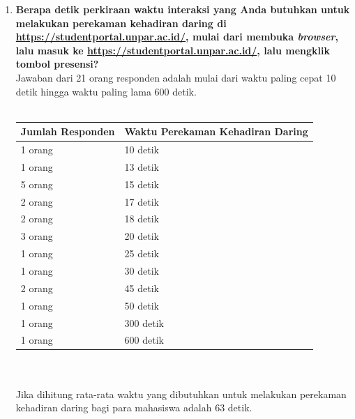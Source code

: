 \begin{enumerate}
	\item \textbf{Berapa detik perkiraan waktu interaksi yang Anda butuhkan untuk melakukan perekaman kehadiran daring di \url{https://studentportal.unpar.ac.id/}, mulai dari membuka \textit{browser}, lalu masuk ke \url{https://studentportal.unpar.ac.id/}, lalu mengklik tombol presensi?}\\
	Jawaban dari 21 orang responden adalah mulai dari waktu paling cepat 10 detik hingga waktu paling lama 600 detik.\\ \\
	 \begin{tabular}{|p{4cm} |p{7cm}|}
		\hline
		Jumlah Responden &  Waktu Perekaman Kehadiran Daring \\ \hline     
		1 orang &  10 detik\\ \hline 
		1 orang &  13 detik\\ \hline 
		5 orang &  15 detik\\ \hline 
		2 orang &  17 detik\\ \hline 
		2 orang &  18 detik\\ \hline 
		3 orang &  20 detik\\ \hline
		1 orang &  25 detik\\ \hline 
		1 orang &  30 detik\\ \hline 
		2 orang &  45 detik\\ \hline
		1 orang &  50 detik\\ \hline 
		1 orang &  300 detik\\ \hline 
		1 orang &  600 detik\\ \hline
	\end{tabular}\\ \\
	Jika dihitung rata-rata waktu yang dibutuhkan untuk melakukan perekaman kehadiran daring bagi para mahasiswa adalah 63 detik.
	

\end{enumerate}
